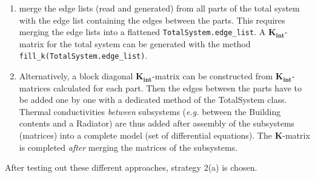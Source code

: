 \begin{footnotesize}
\begin{enumerate}
	\begin{enumerate}
		\item merge the edge lists (read and generated) from all parts of the total system with the edge list containing the edges between the parts. This requires merging  the edge lists into a flattened \texttt{TotalSystem.edge\_list}.  A $\mathbf{K_{int}}$-matrix for the total system can be generated with the method \texttt{fill\_k(TotalSystem.edge\_list)}. 
		\item Alternatively, a block diagonal $\mathbf{K_{int}}$-matrix can be constructed from $\mathbf{K_{int}}$-matrices calculated for  each part. Then the edges between the parts have to be added one by one with a dedicated method of the TotalSystem class. Thermal conductivities \emph{between} subsystems (\textit{e.g.} between the Building contents and a Radiator) are thus added after assembly of the subsystems (matrices) into a complete model (set of differential equations). The $\mathbf{K}$-matrix is completed \emph{after} merging the matrices of the subsystems. 
	\end{enumerate} 
\end{enumerate}
    
    After testing out these different approaches, strategy 2(a) is chosen.  

\end{footnotesize}

\newpage

